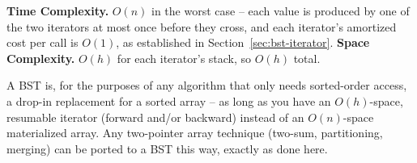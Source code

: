 \begin{complexitybox}
\textbf{Time Complexity.} $O(n)$ in the worst case -- each value is
produced by one of the two iterators at most once before they cross,
and each iterator's amortized cost per call is $O(1)$, as established in
Section~\ref{sec:bst-iterator}.
\textbf{Space Complexity.} $O(h)$ for each iterator's stack, so $O(h)$
total.
\end{complexitybox}

\begin{takeawaybox}
A BST is, for the purposes of any algorithm that only needs sorted-order
access, a drop-in replacement for a sorted array -- as long as you have
an $O(h)$-space, resumable iterator (forward and/or backward) instead of
an $O(n)$-space materialized array. Any two-pointer array technique
(two-sum, partitioning, merging) can be ported to a BST this way, exactly
as done here.
\end{takeawaybox}
